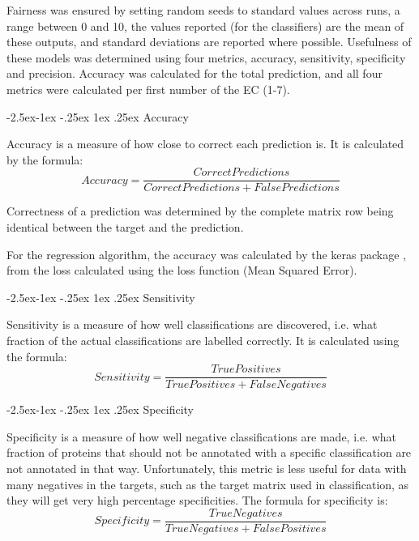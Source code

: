 \documentclass[12pt]{article}
\makeatletter
\renewcommand\paragraph{\@startsection{paragraph}{4}{\z@}
            {-2.5ex\@plus -1ex \@minus -.25ex}
            {1ex \@plus .25ex}
            {\normalfont\normalsize\bfseries}}
\makeatother
\begin{document}
			Fairness was ensured by setting random seeds to standard values across runs, a range between 0 and 10, the values reported (for the classifiers) are the mean of these outputs, and standard deviations are reported where possible.  Usefulness of these models was determined using four metrics, accuracy, sensitivity, specificity and precision.  Accuracy was calculated for the total prediction, and all four metrics were calculated per first number of the EC (1-7).
		
			\paragraph{Accuracy}
			
			Accuracy is a measure of how close to correct each prediction is.  It is calculated by the formula:
			\[Accuracy = \frac{Correct Predictions}{Correct Predictions + False Predictions}\]
			
			Correctness of a prediction was determined by the complete matrix row being identical between the target and the prediction.
			
			For the regression algorithm, the accuracy was calculated by the keras package \citep{RefWorks:doc:5dd5e464e4b029f578dee4d2}, from the loss calculated using the loss function (Mean Squared Error). 
			
			\paragraph{Sensitivity}
			
			Sensitivity is a measure of how well classifications are discovered, i.e. what fraction of the actual classifications are labelled correctly.  It is calculated using the formula: 
			\[Sensitivity = \frac{True Positives}{True Positives + False Negatives}\]
			
			\paragraph{Specificity}
			\label{section:methods:specificity}
			
			Specificity is a measure of how well negative classifications are made, i.e. what fraction of proteins that should not be annotated with a specific classification are not annotated in that way.  Unfortunately, this metric is less useful for data with many negatives in the targets, such as the target matrix used in classification, as they will get very high percentage specificities.  The formula for specificity is:
			\[Specificity = \frac{True Negatives}{True Negatives + False Positives}\]
			
\end{document}
